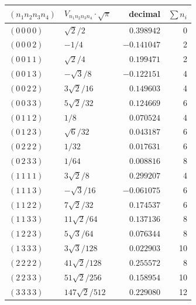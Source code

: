 \documentclass[11pt,a4paper]{article}
\begin{document}
{\small
\renewcommand{\arraystretch}{1.05}
\noindent\begin{tabular}{@{}llrr@{}}
\toprule
$(n_{1}n_{2}n_{3}n_{4})$ & $V_{n_{1}n_{2}n_{3}n_{4}}\cdot\sqrt{\pi}$ & decimal & $\sum n_{i}$ \\
\midrule
$(0\,0\,0\,0)$ & $\sqrt{2}/2$              & $\phantom{-}0.398942$ & 0 \\
$(0\,0\,0\,2)$ & $-1/4$                    & $-0.141047$           & 2 \\
$(0\,0\,1\,1)$ & $\sqrt{2}/4$              & $\phantom{-}0.199471$ & 2 \\
$(0\,0\,1\,3)$ & $-\sqrt{3}/8$             & $-0.122151$           & 4 \\
$(0\,0\,2\,2)$ & $3\sqrt{2}/16$            & $\phantom{-}0.149603$ & 4 \\
$(0\,0\,3\,3)$ & $5\sqrt{2}/32$            & $\phantom{-}0.124669$ & 6 \\
$(0\,1\,1\,2)$ & $1/8$                     & $\phantom{-}0.070524$ & 4 \\
$(0\,1\,2\,3)$ & $\sqrt{6}/32$             & $\phantom{-}0.043187$ & 6 \\
$(0\,2\,2\,2)$ & $1/32$                    & $\phantom{-}0.017631$ & 6 \\
$(0\,2\,3\,3)$ & $1/64$                    & $\phantom{-}0.008816$ & 8 \\
$(1\,1\,1\,1)$ & $3\sqrt{2}/8$             & $\phantom{-}0.299207$ & 4 \\
$(1\,1\,1\,3)$ & $-\sqrt{3}/16$            & $-0.061075$           & 6 \\
$(1\,1\,2\,2)$ & $7\sqrt{2}/32$            & $\phantom{-}0.174537$ & 6 \\
$(1\,1\,3\,3)$ & $11\sqrt{2}/64$           & $\phantom{-}0.137136$ & 8 \\
$(1\,2\,2\,3)$ & $5\sqrt{3}/64$            & $\phantom{-}0.076344$ & 8 \\
$(1\,3\,3\,3)$ & $3\sqrt{3}/128$           & $\phantom{-}0.022903$ & 10 \\
$(2\,2\,2\,2)$ & $41\sqrt{2}/128$          & $\phantom{-}0.255572$ & 8 \\
$(2\,2\,3\,3)$ & $51\sqrt{2}/256$          & $\phantom{-}0.158954$ & 10 \\
$(3\,3\,3\,3)$ & $147\sqrt{2}/512$         & $\phantom{-}0.229080$ & 12 \\
\bottomrule
\end{tabular}
}
\end{document}
